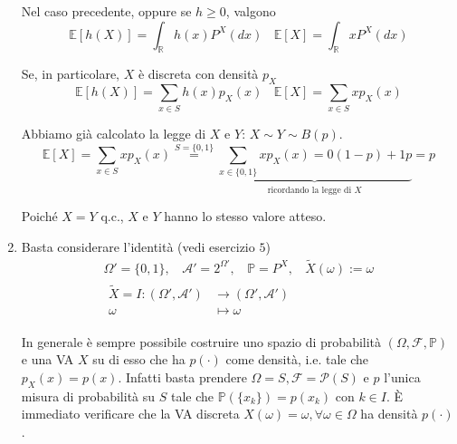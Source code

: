 \begin{enumerate}
\begin{theorem}
Nel caso precedente, oppure se $h\geq 0$, valgono\begin{equation*}
\mathbb{E}[ h( X)] =\int _{\mathbb{R}} h( x) P^{X}( dx) \ \ \ \ \mathbb{E}[ X] =\int _{\mathbb{R}} xP^{X}( dx)
\end{equation*}

Se, in particolare, $X$ è discreta con densità $p_{X}$\begin{equation*}
\mathbb{E}[ h( X)] =\sum\limits _{x\in S} h( x) p_{X}( x) \ \ \ \ \mathbb{E}[ X] =\sum\limits _{x\in S} xp_{X}( x)
\end{equation*}
\end{theorem}

Abbiamo già calcolato la legge di $X$ e $Y$: $X\sim Y\sim B( p)$.\begin{equation*}
\mathbb{E}[ X] =\sum\limits _{x\in S} xp_{X}( x)\overset{S=\{0,1\}}{=}\underbrace{\sum\limits _{x\in \{0,1\}} xp_{X}( x) =0( 1-p) +1p}_{\text{ricordando la legge di } X} =p
\end{equation*}

Poiché $X=Y$ q.c., $X$ e $Y$ hanno lo stesso valore atteso.
\item Basta considerare l'identità (vedi esercizio $5$)\begin{gather*}
\Omega '=\{0,1\} ,\ \ \ \ \mathcal{A} '=2^{\Omega '} ,\ \ \ \ \mathbb{P} =P^{X} ,\ \ \ \ \tilde{X}( \omega ) :=\omega \\
\begin{aligned}
\tilde{X} =I:( \Omega ',\mathcal{A} ') & \rightarrow ( \Omega ',\mathcal{A} ')\\
\omega  & \mapsto \omega 
\end{aligned}
\end{gather*}

\begin{oss}
In generale è sempre possibile costruire uno spazio di probabilità $( \Omega ,\mathcal{F} ,\mathbb{P})$ e una VA $X$ su di esso che ha $p( \cdotp )$ come densità, i.e. tale che $p_{X}( x) =p( x)$. Infatti basta prendere $\Omega =S,\mathcal{F} =\mathcal{P}( S)$ e $p$ l'unica misura di probabilità su $S$ tale che $\mathbb{P}(\{x_{k}\}) =p( x_{k})$ con $k\in I$. È immediato verificare che la VA discreta $X( \omega ) =\omega ,\forall \omega \in \Omega $ ha densità $p( \cdotp )$.
\end{oss}
\end{enumerate}
\subsubsection{}

